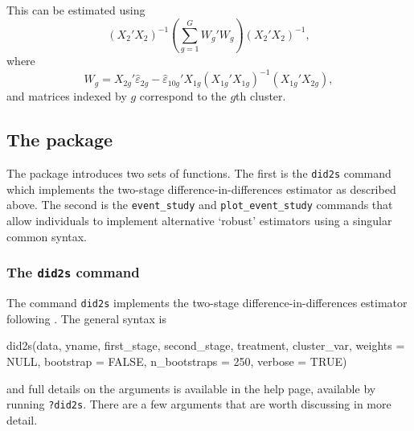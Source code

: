 This can be estimated using \begin{equation}
  \left(X_2'X_2\right)^{-1} \left(\sum_{g=1}^G W_g' W_g\right) \left(X_2'X_2\right)^{-1},
\end{equation} where \[
  W_g = X_{2g}'\hat{\varepsilon}_{2g} - \hat{\varepsilon}_{10g}' X_{1g}\left(X_{1g}'X_{1g}\right)^{-1} \left(X_{1g}'X_{2g}\right),
\] and matrices indexed by \(g\) correspond to the \(g\)th cluster.

\hypertarget{the-package}{%
\subsection{\texorpdfstring{The 
package}{The  package}}\label{the-package}}

The  package introduces two sets of functions. The first
is the \texttt{did2s} command which implements the two-stage
difference-in-differences estimator as described above. The second is
the \texttt{event\_study} and \texttt{plot\_event\_study} commands that
allow individuals to implement alternative `robust' estimators using a
singular common syntax.

\hypertarget{the-did2s-command}{%
\subsubsection{\texorpdfstring{The \texttt{did2s}
command}{The did2s command}}\label{the-did2s-command}}

The command \texttt{did2s} implements the two-stage
difference-in-differences estimator following \citet{Gardner_2021}. The
general syntax is

\begin{Schunk}
\begin{Sinput}
did2s(data, yname, first_stage, second_stage, 
      treatment, cluster_var, weights = NULL, 
      bootstrap = FALSE, n_bootstraps = 250, 
      verbose = TRUE)
\end{Sinput}
\end{Schunk}

and full details on the arguments is available in the help page,
available by running \texttt{?did2s}. There are a few arguments that are
worth discussing in more detail.

